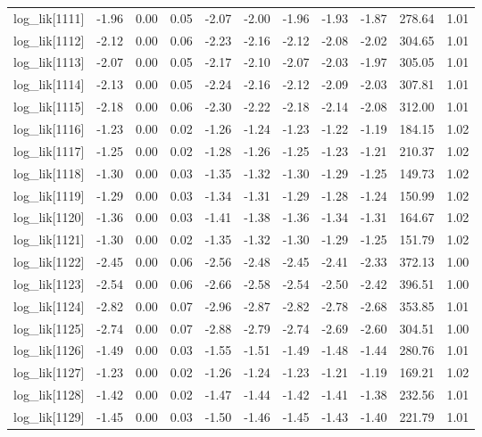 \begin{table}[ht]
\begin{tabular}{rrrrrrrrrrr}
  log\_lik[1111] & -1.96 & 0.00 & 0.05 & -2.07 & -2.00 & -1.96 & -1.93 & -1.87 & 278.64 & 1.01 \\ 
  log\_lik[1112] & -2.12 & 0.00 & 0.06 & -2.23 & -2.16 & -2.12 & -2.08 & -2.02 & 304.65 & 1.01 \\ 
  log\_lik[1113] & -2.07 & 0.00 & 0.05 & -2.17 & -2.10 & -2.07 & -2.03 & -1.97 & 305.05 & 1.01 \\ 
  log\_lik[1114] & -2.13 & 0.00 & 0.05 & -2.24 & -2.16 & -2.12 & -2.09 & -2.03 & 307.81 & 1.01 \\ 
  log\_lik[1115] & -2.18 & 0.00 & 0.06 & -2.30 & -2.22 & -2.18 & -2.14 & -2.08 & 312.00 & 1.01 \\ 
  log\_lik[1116] & -1.23 & 0.00 & 0.02 & -1.26 & -1.24 & -1.23 & -1.22 & -1.19 & 184.15 & 1.02 \\ 
  log\_lik[1117] & -1.25 & 0.00 & 0.02 & -1.28 & -1.26 & -1.25 & -1.23 & -1.21 & 210.37 & 1.02 \\ 
  log\_lik[1118] & -1.30 & 0.00 & 0.03 & -1.35 & -1.32 & -1.30 & -1.29 & -1.25 & 149.73 & 1.02 \\ 
  log\_lik[1119] & -1.29 & 0.00 & 0.03 & -1.34 & -1.31 & -1.29 & -1.28 & -1.24 & 150.99 & 1.02 \\ 
  log\_lik[1120] & -1.36 & 0.00 & 0.03 & -1.41 & -1.38 & -1.36 & -1.34 & -1.31 & 164.67 & 1.02 \\ 
  log\_lik[1121] & -1.30 & 0.00 & 0.02 & -1.35 & -1.32 & -1.30 & -1.29 & -1.25 & 151.79 & 1.02 \\ 
  log\_lik[1122] & -2.45 & 0.00 & 0.06 & -2.56 & -2.48 & -2.45 & -2.41 & -2.33 & 372.13 & 1.00 \\ 
  log\_lik[1123] & -2.54 & 0.00 & 0.06 & -2.66 & -2.58 & -2.54 & -2.50 & -2.42 & 396.51 & 1.00 \\ 
  log\_lik[1124] & -2.82 & 0.00 & 0.07 & -2.96 & -2.87 & -2.82 & -2.78 & -2.68 & 353.85 & 1.01 \\ 
  log\_lik[1125] & -2.74 & 0.00 & 0.07 & -2.88 & -2.79 & -2.74 & -2.69 & -2.60 & 304.51 & 1.00 \\ 
  log\_lik[1126] & -1.49 & 0.00 & 0.03 & -1.55 & -1.51 & -1.49 & -1.48 & -1.44 & 280.76 & 1.01 \\ 
  log\_lik[1127] & -1.23 & 0.00 & 0.02 & -1.26 & -1.24 & -1.23 & -1.21 & -1.19 & 169.21 & 1.02 \\ 
  log\_lik[1128] & -1.42 & 0.00 & 0.02 & -1.47 & -1.44 & -1.42 & -1.41 & -1.38 & 232.56 & 1.01 \\ 
  log\_lik[1129] & -1.45 & 0.00 & 0.03 & -1.50 & -1.46 & -1.45 & -1.43 & -1.40 & 221.79 & 1.01 \\ 

\end{tabular}
\end{table}

